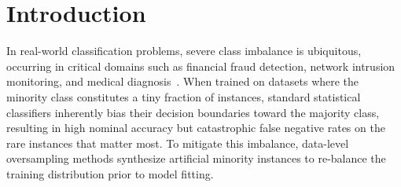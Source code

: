 \documentclass[preprint,10pt]{elsarticle}
\begin{document}
\section{Introduction}\label{sec:intro}
In real-world classification problems, severe class imbalance is ubiquitous, occurring in critical domains such as financial fraud detection, network intrusion monitoring, and medical diagnosis~\cite{chen2024}. When trained on datasets where the minority class constitutes a tiny fraction of instances, standard statistical classifiers inherently bias their decision boundaries toward the majority class, resulting in high nominal accuracy but catastrophic false negative rates on the rare instances that matter most. To mitigate this imbalance, data-level oversampling methods synthesize artificial minority instances to re-balance the training distribution prior to model fitting.
\end{document}
